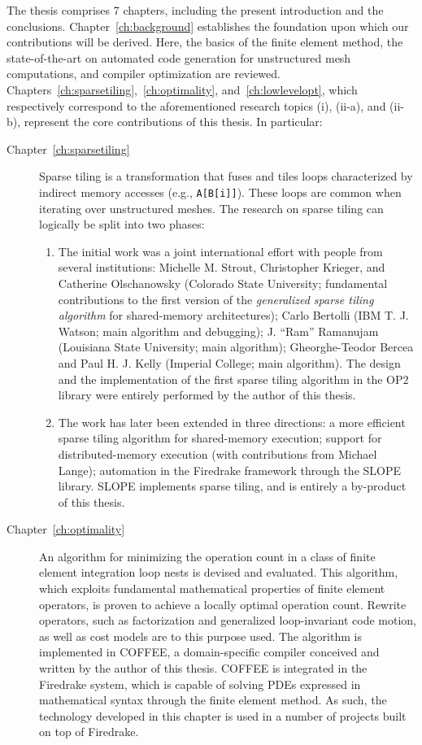 The thesis comprises 7 chapters, including the present introduction and the conclusions. Chapter~\ref{ch:background} establishes the foundation upon which our contributions will be derived. Here, the basics of the finite element method, the state-of-the-art on automated code generation for unstructured mesh computations, and compiler optimization are reviewed. Chapters~\ref{ch:sparsetiling},~\ref{ch:optimality}, and~\ref{ch:lowlevelopt}, which respectively correspond to the aforementioned research topics (i), (ii-a), and (ii-b), represent the core contributions of this thesis. In particular:

\begin{description}
\item[Chapter~\ref{ch:sparsetiling}] Sparse tiling is a transformation that fuses and tiles loops characterized by indirect memory accesses (e.g., {\tt A[B[i]]}). These loops are common when iterating over unstructured meshes. The research on sparse tiling can logically be split into two phases:
\begin{enumerate}
\item The initial work was a joint international effort with people from several institutions: Michelle M. Strout, Christopher Krieger, and Catherine Olschanowsky (Colorado State University; fundamental contributions to the first version of the {\em generalized sparse tiling algorithm} for shared-memory architectures); Carlo Bertolli (IBM T. J. Watson; main algorithm and debugging); J. ``Ram'' Ramanujam (Louisiana State University; main algorithm); Gheorghe-Teodor Bercea and Paul H. J. Kelly (Imperial College; main algorithm). The design and the implementation of the first sparse tiling algorithm in the OP2 library were entirely performed by the author of this thesis. 
\item The work has later been extended in three directions: a more efficient sparse tiling algorithm for shared-memory execution; support for distributed-memory execution (with contributions from Michael Lange); automation in the Firedrake framework through the SLOPE library. SLOPE implements sparse tiling, and is entirely a by-product of this thesis.
\end{enumerate}

\item[Chapter~\ref{ch:optimality}] An algorithm for minimizing the operation count in a class of finite element integration loop nests is devised and evaluated. This algorithm, which exploits fundamental mathematical properties of finite element operators, is proven to achieve a locally optimal operation count. Rewrite operators, such as factorization and generalized loop-invariant code motion, as well as cost models are to this purpose used. The algorithm is implemented in COFFEE, a domain-specific compiler conceived and written by the author of this thesis. COFFEE is integrated in the Firedrake system, which is capable of solving PDEs expressed in mathematical syntax through the finite element method. As such, the technology developed in this chapter is used in a number of projects built on top of Firedrake.


\end{description}
